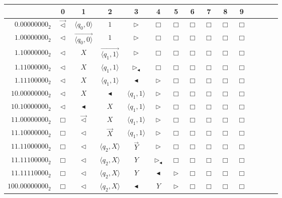 \documentclass[pre,showpacs,showkeys,preprint]{revtex4}
\theoremstyle{definition}
\begin{document}
\begin{figure}
\begin{center}
\scriptsize     {
\renewcommand{\arraystretch}{0.9}
\begin{tabular}{r|cccccccccccccc}
   &0 &1 & 2 & 3 & 4 & 5 & 6 & 7 & 8 & 9 \\ \hline
$0.00000000_2$ & $\overrightarrow{\lhd}$ & $\langle q_0,0 \rangle$ & $1$ & $\rhd$ & $\Box$ & $\Box$ & $\Box$ & $\Box$ & $\Box$ & $\Box$ \\
$1.00000000_2$ & $\lhd$ & $\overrightarrow{\langle q_0,0 \rangle}$ & $1$ & $\rhd$ & $\Box$ & $\Box$ & $\Box$ & $\Box$ & $\Box$ & $\Box$ \\
$1.10000000_2$ & $\lhd$ & $X$ & $\overrightarrow{\langle q_1,1 \rangle}$ & $\rhd$ & $\Box$ & $\Box$ & $\Box$ & $\Box$ & $\Box$ & $\Box$ \\
$1.11000000_2$ & $\lhd$ & $X$ & $\langle q_1,1 \rangle$ & $\rhd_\blacktriangleleft$ & $\Box$ & $\Box$ & $\Box$ & $\Box$ & $\Box$ & $\Box$ \\
$1.11100000_2$ & $\lhd$ & $X$ & $\langle q_1,1 \rangle$ & $\blacktriangleleft$ & $\rhd$ & $\Box$ & $\Box$ & $\Box$ & $\Box$ & $\Box$ \\
$10.00000000_2$ & $\lhd$ & $X$ & $\blacktriangleleft$ & $\langle q_1,1 \rangle$ & $\rhd$ & $\Box$ & $\Box$ & $\Box$ & $\Box$ & $\Box$ \\
$10.10000000_2$ & $\lhd$ & $\blacktriangleleft$ & $X$ & $\langle q_1,1 \rangle$ & $\rhd$ & $\Box$ & $\Box$ & $\Box$ & $\Box$ & $\Box$ \\
$11.00000000_2$ & $\Box$ & $\overrightarrow{\lhd}$ & $X$ & $\langle q_1,1 \rangle$ & $\rhd$ & $\Box$ & $\Box$ & $\Box$ & $\Box$ & $\Box$ \\
$11.10000000_2$ & $\Box$ & $\lhd$ & $\overrightarrow{X}$ & $\langle q_1,1 \rangle$ & $\rhd$ & $\Box$ & $\Box$ & $\Box$ & $\Box$ & $\Box$ \\
$11.11000000_2$ & $\Box$ & $\lhd$ & $\langle q_2,X \rangle$ & $\overrightarrow{Y}$ & $\rhd$ & $\Box$ & $\Box$ & $\Box$ & $\Box$ & $\Box$ \\
$11.11100000_2$ & $\Box$ & $\lhd$ & $\langle q_2,X \rangle$ & $Y$ & $\rhd_\blacktriangleleft$ & $\Box$ & $\Box$ & $\Box$ & $\Box$ & $\Box$ \\
$11.11110000_2$ & $\Box$ & $\lhd$ & $\langle q_2,X \rangle$ & $Y$ & $\blacktriangleleft$ & $\rhd$ & $\Box$ & $\Box$ & $\Box$ & $\Box$ \\
$100.00000000_2$ & $\Box$ & $\lhd$ & $\langle q_2,X \rangle$ & $\blacktriangleleft$ & $Y$ & $\rhd$ & $\Box$ & $\Box$ & $\Box$ & $\Box$ \\

\end{tabular}}
\end{center}
\end{figure}
\end{document}
